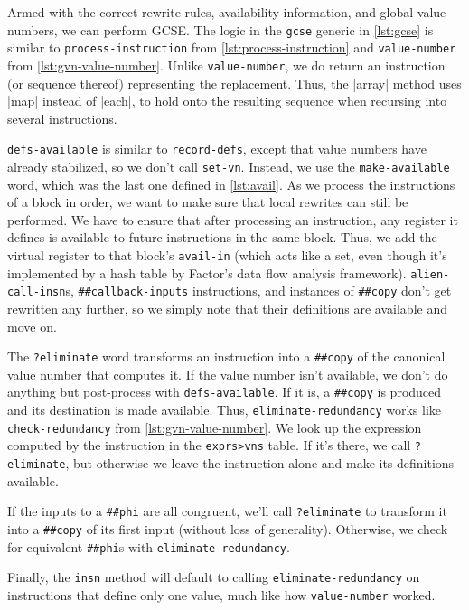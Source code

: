 Armed with the correct rewrite rules, availability information, and global
value numbers, we can perform \gls{GCSE}.  The logic in the \Verb|gcse|
generic in \vref{lst:gcse} is similar to \Verb|process-instruction| from
\cref{lst:process-instruction} and \Verb|value-number| from
\vref{lst:gvn-value-number}.  Unlike \Verb|value-number|, we do return an
instruction (or sequence thereof) representing the replacement.  Thus, the
\factor|array| method uses \factor|map| instead of \factor|each|, to hold onto
the resulting sequence when recursing into several instructions.

\Verb|defs-available| is similar to \Verb|record-defs|, except that value
numbers have already stabilized, so we don't call \Verb|set-vn|.  Instead, we
use the \Verb|make-available| word, which was the last one defined in
\vref{lst:avail}.  As we process the instructions of a block in order, we want
to make sure that local rewrites can still be performed.  We have to ensure
that after processing an instruction, any register it defines is available to
future instructions in the same block.  Thus, we add the virtual register to
that block's \Verb|avail-in| (which acts like a set, even though it's
implemented by a hash table by Factor's data flow analysis framework).
\Verb|alien-call-insn|s, \Verb|##callback-inputs| instructions, and
instances of \Verb|##copy| don't get rewritten any further, so we simply note
that their definitions are available and move on.

The \Verb|?eliminate| word transforms an instruction into a \Verb|##copy|
of the canonical value number that computes it.  If the value number isn't
available, we don't do anything but post-process with \Verb|defs-available|.
If it is, a \Verb|##copy| is produced and its destination is made available.
Thus, \Verb|eliminate-redundancy| works like \Verb|check-redundancy| from
\vref{lst:gvn-value-number}.  We look up the expression computed by the
instruction in the \Verb|exprs>vns| table.  If it's there, we call
\Verb|?eliminate|, but otherwise we leave the instruction alone and make its
definitions available.

If the inputs to a \Verb|##phi| are all congruent, we'll call
\Verb|?eliminate| to transform it into a \Verb|##copy| of its first input
(without loss of generality).  Otherwise, we check for equivalent
\Verb|##phi|s with \Verb|eliminate-redundancy|.

Finally, the \Verb|insn| method will default to calling
\Verb|eliminate-redundancy| on instructions that define only one value, much
like how \Verb|value-number| worked.

